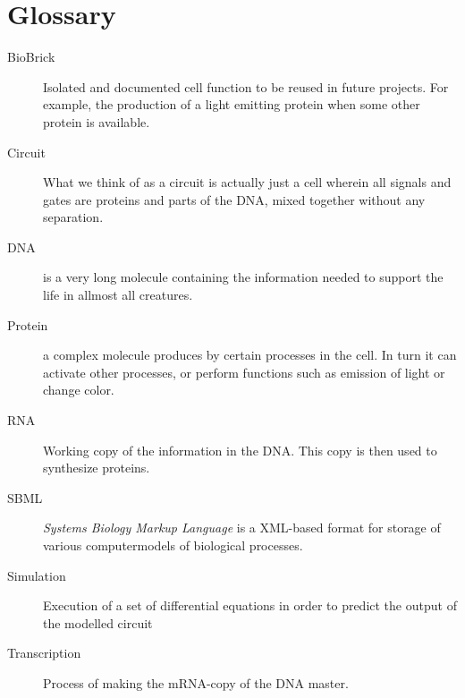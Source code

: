 \documentclass[a4paper]{article}
\begin{document}
\section{Glossary} %
\begin{description}
	\item[BioBrick] Isolated and documented cell function to be reused in future projects. For example, the production of a light emitting protein when some other protein is available.
	\item[Circuit] What we think of as a circuit is actually just a cell wherein all signals and gates are proteins and parts of the DNA, mixed together without any separation.
	\item[DNA]  is a very long molecule containing the information needed to support the life in allmost all creatures.
	\item[Protein] a complex molecule produces by certain processes in the cell. In turn it can activate other processes, or perform functions such as emission of light or change color.
	\item[RNA] Working copy of the information in the DNA. This copy is then used to synthesize proteins.
	\item[SBML] \textit{Systems Biology Markup Language} is a XML-based format for storage of various computermodels of biological processes.
	\item[Simulation] Execution of a set of differential equations in order to predict the output of the modelled circuit
	\item[Transcription] Process of making the mRNA-copy of the DNA master.
\end{description}
\end{document}
